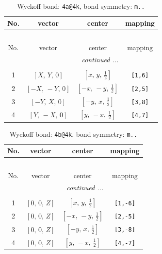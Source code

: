 \documentclass[fleqn,8pt]{jsarticle}
\begin{document}
\begin{longtable}{cccc}
\caption{Wyckoff bond: {\tt 4a@4k}, bond symmetry: {\tt m..}}
 \\
 \hline \hline
No. & vector & center & mapping \\ \hline \endfirsthead

\multicolumn{3}{l}{\tablename\ \thetable{}} \\
 \hline \hline
No. & vector & center & mapping \\ \hline \endhead

 \hline \hline
\multicolumn{3}{r}{\footnotesize\it continued ...} \\ \endfoot

 \hline \hline
\multicolumn{3}{r}{} \\ \endlastfoot

1 & $\left[ X,\, Y,\, 0 \right]$ & $\left[ x,\, y,\, \frac{1}{2} \right]$ & {\tt [1,6]} \\ \hline
2 & $\left[ - X,\, - Y,\, 0 \right]$ & $\left[ - x,\, - y,\, \frac{1}{2} \right]$ & {\tt [2,5]} \\ \hline
3 & $\left[ - Y,\, X,\, 0 \right]$ & $\left[ - y,\, x,\, \frac{1}{2} \right]$ & {\tt [3,8]} \\ \hline
4 & $\left[ Y,\, - X,\, 0 \right]$ & $\left[ y,\, - x,\, \frac{1}{2} \right]$ & {\tt [4,7]} \\
\end{longtable}
\renewcommand{\arraystretch}{1.2}
\begin{longtable}{cccc}
\caption{Wyckoff bond: {\tt 4b@4k}, bond symmetry: {\tt m..}}
 \\
 \hline \hline
No. & vector & center & mapping \\ \hline \endfirsthead

\multicolumn{3}{l}{\tablename\ \thetable{}} \\
 \hline \hline
No. & vector & center & mapping \\ \hline \endhead

 \hline \hline
\multicolumn{3}{r}{\footnotesize\it continued ...} \\ \endfoot

 \hline \hline
\multicolumn{3}{r}{} \\ \endlastfoot

1 & $\left[ 0,\, 0,\, Z \right]$ & $\left[ x,\, y,\, \frac{1}{2} \right]$ & {\tt [1,-6]} \\ \hline
2 & $\left[ 0,\, 0,\, Z \right]$ & $\left[ - x,\, - y,\, \frac{1}{2} \right]$ & {\tt [2,-5]} \\ \hline
3 & $\left[ 0,\, 0,\, Z \right]$ & $\left[ - y,\, x,\, \frac{1}{2} \right]$ & {\tt [3,-8]} \\ \hline
4 & $\left[ 0,\, 0,\, Z \right]$ & $\left[ y,\, - x,\, \frac{1}{2} \right]$ & {\tt [4,-7]} \\
\end{longtable}
\end{document}
